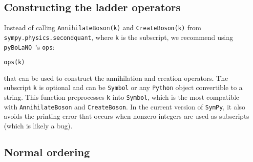 \documentclass[5p, twocolumn, 10pt, sort&compress]{elsarticle}
\newcommand{\inlinecode}[1]{\texttt{#1}}
\newcommand{\pybolano}{\texttt{pyBoLaNO}~}
\begin{document}
\subsection{Constructing the ladder operators}

Instead of calling \inlinecode{AnnihilateBoson(k)} and \inlinecode{CreateBoson(k)} from \inlinecode{sympy.physics.secondquant}, where \inlinecode{k} is the subscript, we recommend using \pybolano's \inlinecode{ops}: 
\begin{verbatim}
ops(k)
\end{verbatim}
that can be used to construct the annihilation and creation operators. The subscript \inlinecode{k} is optional and can be \inlinecode{Symbol} or any \texttt{Python} object convertible to a string. This function preprocesses \inlinecode{k} into \inlinecode{Symbol}, which is the most compatible with \inlinecode{AnnihilateBoson} and \inlinecode{CreateBoson}. In the current version of \texttt{SymPy}, it also avoids the printing error that occurs when nonzero integers are used as subscripts (which is likely a bug).

\subsection{Normal ordering}
\label{subsec_normal_ordering}
\end{document}
